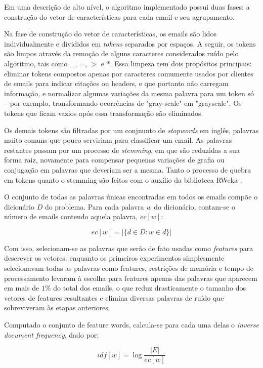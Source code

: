 \documentclass[10pt,twocolumn,letterpaper]{article}
\begin{document}
Em uma descrição de alto nível, o algoritmo implementado possui duas fases: a construção do vetor de características para cada email e seu agrupamento.

Na fase de construção do vetor de características, os emails são lidos individualmente e divididos em \emph{tokens} separados por espaços. A seguir, os tokens são limpos através da remoção de alguns caracteres considerados ruído pelo algoritmo, tais como \_, =, $>$ e *. Essa limpeza tem dois propósitos principais: eliminar tokens compostos apenas por caracteres comumente usados por clientes de emails para indicar citações ou headers, e que portanto não carregam informação, e normalizar algumas variações da mesma palavra para um token só -- por exemplo, transformando ocorrências de "gray-scale" em "grayscale". Os tokens que ficam vazios após essa transformação são eliminados.

Os demais tokens são filtradas por um conjnunto de \emph{stopwords} em inglês, palavras muito comuns que pouco serviriam para classificar um email. As palavras restantes passam por um processo de \emph{stemming}, em que são reduzidas a sua forma raiz, novamente para compensar pequenas variações de grafia ou conjugação em palavras que deveriam ser a mesma. Tanto o processo de quebra em tokens quanto o stemming são feitos com o auxílio da biblioteca RWeka \cite{RWeka}.

O conjunto de todas as palavras únicas encontradas em todos os emails compõe o dicionário $D$ do problema. Para cada palavra $w$ do dicionário, contam-se o número de emails contendo aquela palavra, $ec[w]$:

\begin{displaymath}
ec[w] = |\{ d \in D : w \in d\}|
\end{displaymath}

Com isso, selecionam-se as palavras que serão de fato usadas como \emph{features} para descrever os vetores: enquanto os primeiros experimentos simplesmente selecionavam todas as palavras como features, restrições de memória e tempo de processamento levaram à escolha para features apenas das palavras que aparecem em mais de $1\%$ do total dos emails, o que reduz drasticamente o tamanho dos vetores de features resultantes e elimina diversas palavras de ruído que sobreviveram às etapas anteriores. 

Computado o conjunto de feature words, calcula-se para cada uma delas o \emph{inverse document frequency}, dado por:

\begin{displaymath}
idf[w] = \log{\frac{|E|}{ec[w]}}
\end{displaymath}
\end{document}
